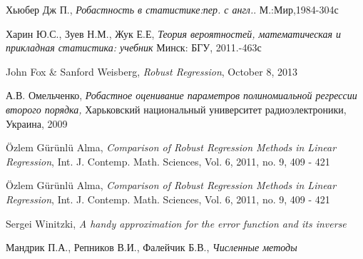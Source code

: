 \documentclass[12pt]{article}
\begin{document}
\begin{thebibliography}{9}
    Хьюбер Дж П.,
    \textit{Робастность в статистике:пер. с англ.}.
    М.:Мир,1984-304с

    Харин Ю.С., Зуев Н.М.,
    Жук Е.Е,
    \textit{Теория вероятностей, математическая и прикладная статистика: учебник}
    Минск: БГУ, 2011.-463с

    John Fox \& Sanford Weisberg,
    \textit{Robust Regression},
    October 8, 2013

    А.В. Омельченко,
    \textit{Робастное оценивание параметров полиномиальной регрессии второго порядка,}
    Харьковский национальный университет радиоэлектроники, Украина, 2009

    \"{O}zlem G\"{u}r\"{u}nl\"{u} Alma,
    \textit{Comparison of Robust Regression Methods
    in Linear Regression},
    Int. J. Contemp. Math. Sciences, Vol. 6, 2011, no. 9, 409 - 421

    \"{O}zlem G\"{u}r\"{u}nl\"{u} Alma,
    \textit{Comparison of Robust Regression Methods
    in Linear Regression},
    Int. J. Contemp. Math. Sciences, Vol. 6, 2011, no. 9, 409 - 421

    Sergei Winitzki,
    \textit{A handy approximation for the error function and its inverse}

    Мандрик П.А., Репников В.И., Фалейчик Б.В.,
    \textit{Численные методы}
\end{thebibliography}
\end{document}
